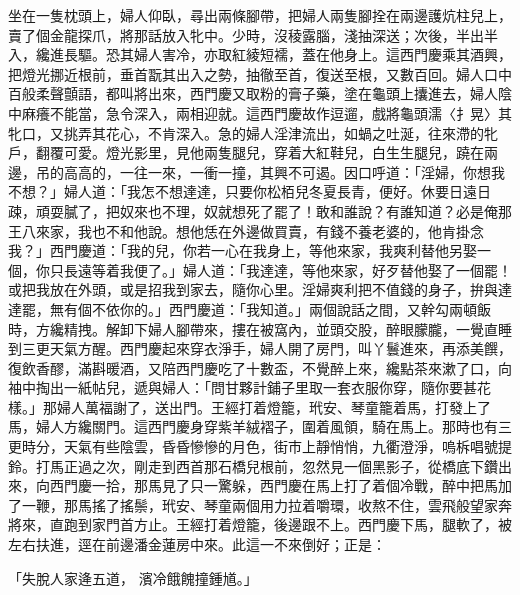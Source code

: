 坐在一隻枕頭上，婦人仰臥，尋出兩條腳帶，把婦人兩隻腳拴在兩邊護炕柱兒上，賣了個金龍探爪，將那話放入牝中。少時，沒稜露腦，淺抽深送；次後，半出半入，纔進長驅。恐其婦人害冷，亦取紅綾短襦，蓋在他身上。這西門慶乘其酒興，把燈光挪近根前，垂首翫其出入之勢，抽徹至首，復送至根，又數百回。婦人口中百般柔聲顫語，都叫將出來，西門慶又取粉的膏子藥，塗在龜頭上攮進去，婦人陰中麻癢不能當，急令深入，兩相迎就。這西門慶故作逗遛，戲將龜頭濡〈扌晃〉其牝口，又挑弄其花心，不肯深入。急的婦人淫津流出，如蝸之吐涎，往來滯的牝戶，翻覆可愛。燈光影里，見他兩隻腿兒，穿着大紅鞋兒，白生生腿兒，蹺在兩邊，吊的高高的，一往一來，一衝一撞，其興不可遏。因口呼道：「淫婦，你想我不想？」婦人道：「我怎不想達達，只要你松栢兒冬夏長青，便好。休要日遠日疎，頑耍膩了，把奴來也不理，奴就想死了罷了！敢和誰說？有誰知道？必是俺那王八來家，我也不和他說。想他恁在外邊做買賣，有錢不養老婆的，他肯掛念我？」西門慶道：「我的兒，你若一心在我身上，等他來家，我爽利替他另娶一個，你只長遠等着我便了。」婦人道：「我達達，等他來家，好歹替他娶了一個罷！或把我放在外頭，或是招我到家去，隨你心里。淫婦爽利把不值錢的身子，拚與達達罷，無有個不依你的。」西門慶道：「我知道。」兩個說話之間，又幹勾兩頓飯時，方纔精拽。解卸下婦人腳帶來，摟在被窩內，並頭交股，醉眼朦朧，一覺直睡到三更天氣方醒。西門慶起來穿衣淨手，婦人開了房門，叫丫鬟進來，再添美饌，復飲香醪，滿斟暖酒，又陪西門慶吃了十數盃，不覺醉上來，纔點茶來漱了口，向袖中掏出一紙帖兒，遞與婦人：「問甘夥計鋪子里取一套衣服你穿，隨你要甚花樣。」那婦人萬福謝了，送出門。王經打着燈籠，玳安、琴童籠着馬，打發上了馬，婦人方纔關門。這西門慶身穿紫羊絨褶子，圍着風領，騎在馬上。那時也有三更時分，天氣有些陰雲，昏昏慘慘的月色，街巿上靜悄悄，九衢澄淨，嗚柝唱號提鈴。打馬正過之次，剛走到西首那石橋兒根前，忽然見一個黑影子，從橋底下鑽出來，向西門慶一拾，那馬見了只一驚躲，西門慶在馬上打了着個冷戰，醉中把馬加了一鞭，那馬搖了搖鬃，玳安、琴童兩個用力拉着嚼環，收熬不住，雲飛般望家奔將來，直跑到家門首方止。王經打着燈籠，後邊跟不上。西門慶下馬，腿軟了，被左右扶進，逕在前邊潘金蓮房中來。此這一不來倒好；正是：

「失脫人家逄五道，  濱冷餓餽撞鍾馗。」

